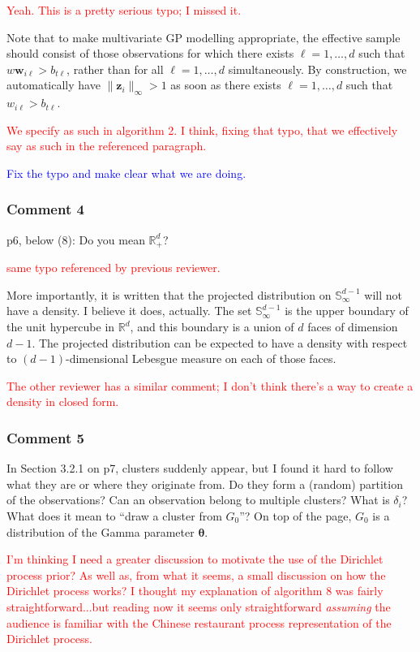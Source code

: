 \documentclass[10pt]{article}
\newcommand{\bruno}[1]{\textcolor{blue}{#1}} %
\newcommand{\peter}[1]{\textcolor{red}{#1}}  %
\begin{document}
\peter{Yeah.  This is a pretty serious typo; I missed it.}

Note that to make multivariate GP modelling appropriate, the effective sample should consist of those observations for which there exists $\ell = 1,\ldots,d$ such that $w\bm{w}_{i\ell} > b_{t\ell}$, rather than for all $\ell = 1,\ldots,d$ simultaneously. By construction, we automatically have $\lVert \bm{z}_i\rVert_{\infty} > 1$ as soon as there exists $\ell = 1,\ldots,d$ such that $w_{i\ell} > b_{t\ell}$.

\peter{We specify as such in algorithm 2.  I think, fixing that typo, that we effectively say as such in the referenced paragraph.}

\bruno{Fix the typo and make clear what we are doing.}

\subsubsection*{Comment 4}
p6, below (8): Do you mean $\mathbb{R}_+^d$? 

\peter{same typo referenced by previous reviewer.}

More importantly, it is written that the projected distribution on $\mathbb{S}_{\infty}^{d-1}$ will not have a density. I believe it does, actually. The set $\mathbb{S}_{\infty}^{d-1}$ is the upper boundary of the unit hypercube in $\mathbb{R}^d$, and this boundary is a union of $d$ faces of dimension $d-1$. The projected distribution can be expected to have a density with respect to $(d - 1)$-dimensional Lebesgue measure on each of those faces.

\peter{The other reviewer has a similar comment; I don't think there's a way to create a density in closed form.}

\subsubsection*{Comment 5}
In Section 3.2.1 on p7, clusters suddenly appear, but I found it hard to follow what they are or where they originate from. Do they form a (random) partition of the observations? Can an observation belong to multiple clusters? What is $\delta_i$? What does it mean to “draw a cluster from $G_0$”? On top of the page, $G_0$ is a distribution of the Gamma parameter $\bm{\theta}$.

\peter{I'm thinking I need a greater discussion to motivate the use of the Dirichlet process prior?  As well as, from what it seems, a small discussion on how the Dirichlet process works?  I thought my explanation of algorithm 8 was fairly straightforward...but reading now it seems only straightforward \emph{assuming} the audience is familiar with the Chinese restaurant process representation of the Dirichlet process.}
\end{document}
